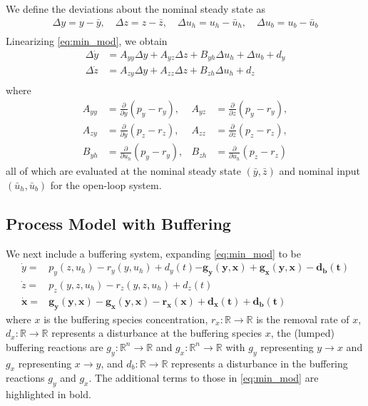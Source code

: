 \documentclass[letterpaper, 10 pt,  conference]{ieeeconf}  %
\newcommand{\R}{{\mathbb R}}
\begin{document}
We define the deviations about the nominal steady state as
\begin{equation*}
\begin{aligned}
	\Delta y =y-\bar{y},\quad \Delta z =z-\bar z,\quad \Delta u_h =u_h-\bar{u}_h,\quad \Delta u_b =u_b-\bar{u}_b\\
\end{aligned}
\end{equation*}
Linearizing \eqref{eq:min_mod}, we obtain
\begin{equation}\label{eq:min_mod_ol}
\begin{aligned}
\Delta\dot{y}&=A_{yy}\Delta y+A_{yz}\Delta z+B_{yh}\Delta u_h+\Delta u_b+d_y\\
\Delta\dot{z}&=A_{zy}\Delta y+A_{zz}\Delta z+B_{zh}\Delta u_h+d_z\\
\end{aligned}
\end{equation}
where 
\begin{equation*}
\begin{aligned}
A_{yy}&=\frac{\partial}{\partial y}(p_y-r_y),&A_{yz}&=\frac{\partial}{\partial z}(p_y-r_y),\\
A_{zy}&=\frac{\partial}{\partial y}(p_z-r_z),&A_{zz}&=\frac{\partial}{\partial z}(p_z-r_z),\\
B_{yh}&=\frac{\partial}{\partial u_h}(p_y-r_y),&B_{zh}&=\frac{\partial}{\partial u_h}(p_z-r_z)
\end{aligned}
\end{equation*}
all of which are evaluated at the nominal steady state $(\bar{y},\bar{z})$ and nominal input $(\bar{u}_h,\bar{u}_b)$ for the open-loop system. 

\subsection{Process Model with Buffering}

We next include a buffering system, expanding \eqref{eq:min_mod} to be
\begin{equation}\label{eq:min_mod_buff}
\begin{aligned}
	\dot{y}=&p_y(z,u_h)-r_y(y,u_h)+d_y(t)\mathbf{-g_y(y,x)+g_x(y,x)-d_b(t)}\\
	\dot{z}=&p_z(y,z,u_h)-r_z(y,z,u_h)+d_z(t)\\
	\mathbf{\dot{x}}=&\mathbf{g_y(y,x)-g_x(y,x)-r_x(x)+d_x(t)+d_b(t)}
\end{aligned}
\end{equation}
where $x$ is the buffering species concentration, $r_x:\R\to\R$ is the removal rate of $x$, $d_x:\R\to\R$ represents a disturbance at the buffering species $x$, the (lumped) buffering reactions are $g_y:\R^n\to\R$ and $g_x:\R^n\to\R$ with $g_y$ representing $y\!\rightarrow\!x$ and $g_x$ representing $x\!\rightarrow\!y$, and $d_b:\R\to\R$ represents a disturbance in the buffering reactions $g_y$ and $g_x$. The additional terms to those in \eqref{eq:min_mod} are highlighted in bold.
\end{document}
